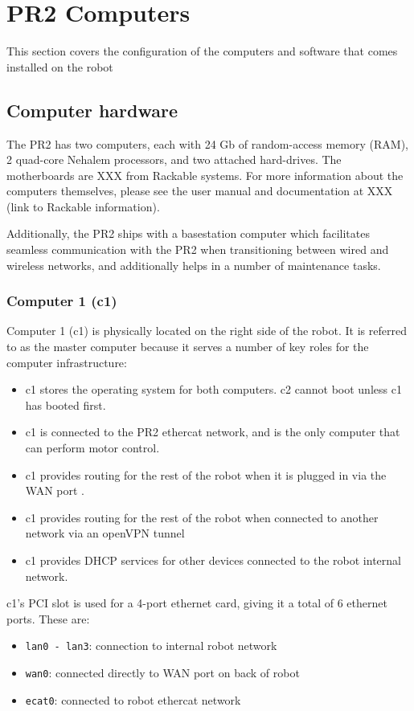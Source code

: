 \chapter{PR2 Computers}
This section covers the configuration of the computers and software that comes installed on the robot
\section{Computer hardware}
The PR2 has two computers, each with 24 Gb of random-access memory (RAM), 2
quad-core Nehalem processors, and two attached hard-drives.  The
motherboards are XXX from Rackable systems.  For more information
about the computers themselves, please see the user manual and
documentation at XXX (link to Rackable information).

Additionally, the PR2 ships with a basestation computer which
facilitates seamless communication with the PR2 when transitioning
between wired and wireless networks, and additionally helps in
a number of maintenance tasks.
\subsection{Computer 1 (c1)}
Computer 1 (c1) is physically located on the right side of the
robot. It is referred to as the master computer because it serves a
number of key roles for the computer infrastructure:
\begin{itemize}
\item c1 stores the operating system for both computers.  c2 cannot
  boot unless c1 has booted first.
\item c1 is connected to the PR2 ethercat network, and is the only
  computer that can perform motor control.
\item c1 provides routing for the rest of the robot when it is plugged
  in via the WAN port .
\item c1 provides routing for the rest of the robot when connected to
  another network via an openVPN tunnel
\item c1 provides DHCP services for other devices connected to the
  robot internal network.
\end{itemize}

c1's PCI slot is used for a 4-port ethernet card, giving it a
total of 6 ethernet ports. These are:
\begin{itemize}
\item \texttt{lan0 - lan3}: connection to internal robot network 
\item \texttt{wan0}: connected directly to WAN port on back of robot
\item \texttt{ecat0}: connected to robot ethercat network 
\end{itemize}

